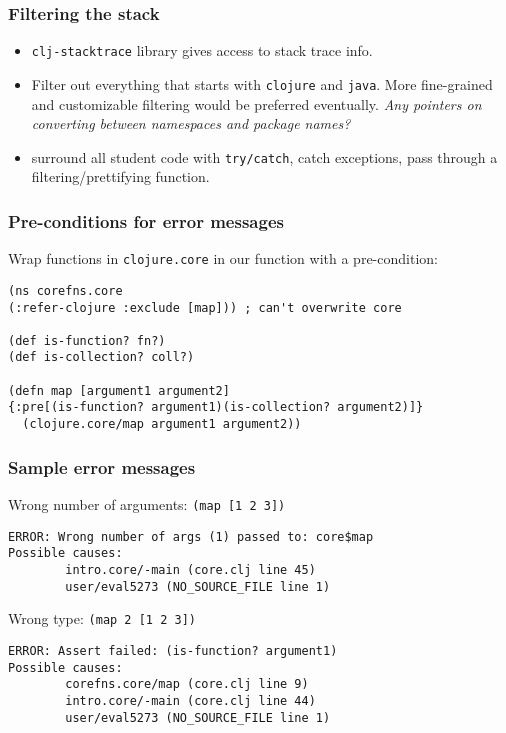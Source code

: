 \documentclass{beamer}
\begin{document}
\begin{frame}
  \frametitle{Filtering the stack}
\begin{itemize}
\item {\tt clj-stacktrace} library gives access to stack trace info. 
\item Filter out everything that starts with {\tt clojure} and {\tt java}. More fine-grained and customizable filtering would be preferred eventually. {\it Any pointers on converting between namespaces and package names?}
\item surround all student code with {\tt try/catch}, catch exceptions, pass through a filtering/prettifying function. 
\end{itemize}
\end{frame}

\begin{frame}[fragile]
  \frametitle{Pre-conditions for error messages}
Wrap functions in {\tt clojure.core} in our function with a pre-condition:
\begin{verbatim}
(ns corefns.core
(:refer-clojure :exclude [map])) ; can't overwrite core 

(def is-function? fn?)
(def is-collection? coll?)

(defn map [argument1 argument2]
{:pre[(is-function? argument1)(is-collection? argument2)]}
  (clojure.core/map argument1 argument2))
\end{verbatim}
\end{frame}

\begin{frame}[fragile]
  \frametitle{Sample error messages}
Wrong number of arguments: {\tt (map [1 2 3])}
\begin{verbatim}
ERROR: Wrong number of args (1) passed to: core$map
Possible causes:
        intro.core/-main (core.clj line 45)
        user/eval5273 (NO_SOURCE_FILE line 1)
\end{verbatim}
Wrong type: {\tt (map 2 [1 2 3])}
\begin{verbatim}
ERROR: Assert failed: (is-function? argument1)
Possible causes:
        corefns.core/map (core.clj line 9)
        intro.core/-main (core.clj line 44)
        user/eval5273 (NO_SOURCE_FILE line 1)
\end{verbatim}
\end{frame}
\end{document}
